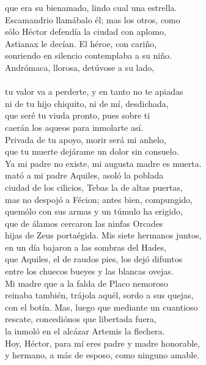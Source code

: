 que era su bienamado, lindo cual una estrella.\\
Escamandrio llamábalo él; mas los otros, como\\
sólo Héctor defendía la ciudad con aplomo,\\
Astianax le decían. El héroe, con cariño,\\
sonriendo en silencio contemplaba a su niño.\\
Andrómaca, llorosa, detúvose a su lado,\\
\\
tu valor va a perderte, y en tanto no te apiadas\\
ni de tu hijo chiquito, ni de mí, desdichada,\\
que seré tu viuda pronto, pues sobre ti\\
caerán los aqueos para inmolarte así.\\
Privada de tu apoyo, morir será mi anhelo,\\
que tu muerte dejárame un dolor sin consuelo.\\
Ya mi padre no existe, mi augusta madre es muerta.\\
mató a mi padre Aquiles, asoló la poblada\\
ciudad de los cilicios, Tebas la de altas puertas,\\
mas no despojó a Fécion; antes bien, compungido,\\
quemólo con sus armas y un túmulo ha erigido,\\
que de álamos cercaron las ninfas Orcades\\
hijas de Zeus portaégida. Mis siete hermanos juntos,\\
en un día bajaron a las sombras del Hades,\\
que Aquiles, el de raudos pies, los dejó difuntos\\
entre los chuecos bueyes y las blancas ovejas.\\
Mi madre que a la falda de Placo nemoroso\\
reinaba también, trájola aquél, sordo a sus quejas,\\
con el botín. Mas, luego que mediante un cuantioso\\
rescate, concediónos que libertada fuera,\\
la inmoló en el alcázar Artemis la flechera.\\
Hoy, Héctor, para mí eres padre y madre honorable,\\
y hermano, a más de esposo, como ninguno amable.\\
